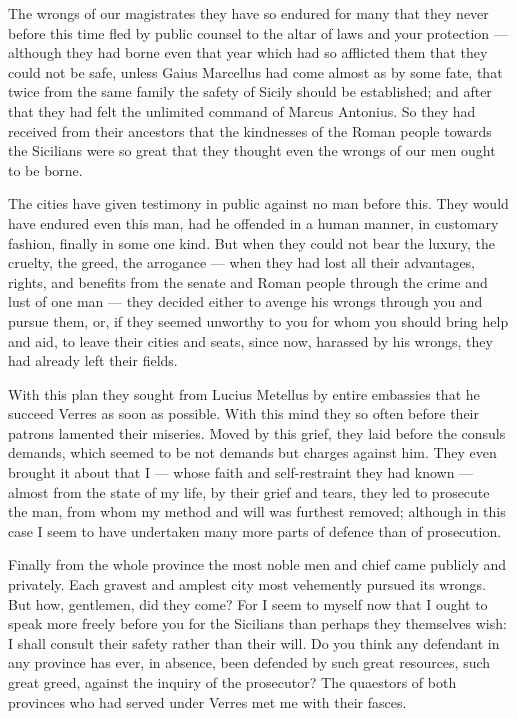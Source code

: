  The wrongs of our magistrates they have so endured for many that they never before this time fled by public counsel to the altar of laws and your protection --- although they had borne even that year which had so afflicted them that they could not be safe, unless Gaius Marcellus had come almost as by some fate, that twice from the same family the safety of Sicily should be established; and after that they had felt the unlimited command of Marcus Antonius. So they had received from their ancestors that the kindnesses of the Roman people towards the Sicilians were so great that they thought even the wrongs of our men ought to be borne.

 The cities have given testimony in public against no man before this. They would have endured even this man, had he offended in a human manner, in customary fashion, finally in some one kind. But when they could not bear the luxury, the cruelty, the greed, the arrogance --- when they had lost all their advantages, rights, and benefits from the senate and Roman people through the crime and lust of one man --- they decided either to avenge his wrongs through you and pursue them, or, if they seemed unworthy to you for whom you should bring help and aid, to leave their cities and seats, since now, harassed by his wrongs, they had already left their fields.

 With this plan they sought from Lucius Metellus by entire embassies that he succeed Verres as soon as possible. With this mind they so often before their patrons lamented their miseries. Moved by this grief, they laid before the consuls demands, which seemed to be not demands but charges against him. They even brought it about that I --- whose faith and self-restraint they had known --- almost from the state of my life, by their grief and tears, they led to prosecute the man, from whom my method and will was furthest removed; although in this case I seem to have undertaken many more parts of defence than of prosecution.

 Finally from the whole province the most noble men and chief came publicly and privately. Each gravest and amplest city most vehemently pursued its wrongs. But how, gentlemen, did they come? For I seem to myself now that I ought to speak more freely before you for the Sicilians than perhaps they themselves wish: I shall consult their safety rather than their will. Do you think any defendant in any province has ever, in absence, been defended by such great resources, such great greed, against the inquiry of the prosecutor? The quaestors of both provinces who had served under Verres met me with their fasces.

